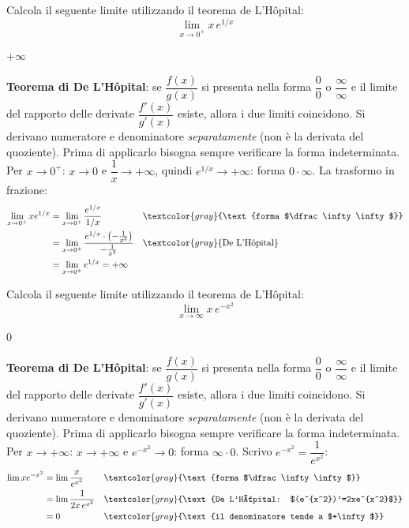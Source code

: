
\begin{question}[ID=1.7, subtitle={De L'Hôpital: $\lim_{x\to0^+} xe^{1/x}$}, tags={de l'hospital, limiti}, difficulty=media]
Calcola il seguente limite utilizzando il teorema de L'Hôpital:
\[
\lim_{x \to 0^+}  x\, e^{1/x}
\]
\begin{solution}
$+\infty$
\end{solution}
\begin{explanation}
\textbf{Teorema di De L'Hôpital}: se $\dfrac{f(x)}{g(x)}$ si presenta nella forma $\dfrac00$ o $\dfrac\infty\infty$ e il limite del rapporto delle derivate $\dfrac{f'(x)}{g'(x)}$ esiste, allora i due limiti coincidono. Si derivano numeratore e denominatore \emph{separatamente} (non è la derivata del quoziente). Prima di applicarlo bisogna sempre verificare la forma indeterminata.
Per $x\to0^+$: $x\to0$ e $\dfrac1x\to+\infty$, quindi $e^{1/x}\to+\infty$: forma $0\cdot\infty$. La trasformo in frazione:
\[\begin{aligned}
\lim_{x\to0^+}xe^{1/x} &= \lim_{x\to0^+}\dfrac{e^{1/x}}{1/x} && \textcolor{gray}{\text{forma $\dfrac\infty\infty$}}\\
&= \lim_{x\to0^+}\dfrac{e^{1/x}\cdot\left(-\frac1{x^2}\right)}{-\frac1{x^2}} && \textcolor{gray}{\text{De L'Hôpital}}\\
&= \lim_{x\to0^+}e^{1/x}=+\infty
\end{aligned}\]
\end{explanation}
\end{question}


\begin{question}[ID=1.8, subtitle={De L'Hôpital: $\lim_{x\to+\infty} xe^{-x^2}$}, tags={de l'hospital, limiti}, difficulty=facile]
Calcola il seguente limite utilizzando il teorema de L'Hôpital:
\[
\lim_{x \to \infty}  x\, e^{-x^2}
\]
\begin{solution}
$0$
\end{solution}
\begin{explanation}
\textbf{Teorema di De L'Hôpital}: se $\dfrac{f(x)}{g(x)}$ si presenta nella forma $\dfrac00$ o $\dfrac\infty\infty$ e il limite del rapporto delle derivate $\dfrac{f'(x)}{g'(x)}$ esiste, allora i due limiti coincidono. Si derivano numeratore e denominatore \emph{separatamente} (non è la derivata del quoziente). Prima di applicarlo bisogna sempre verificare la forma indeterminata.
Per $x\to+\infty$: $x\to+\infty$ e $e^{-x^2}\to0$: forma $\infty\cdot0$. Scrivo $e^{-x^2}=\dfrac{1}{e^{x^2}}$:
\[\begin{aligned}
\lim xe^{-x^2} &= \lim\dfrac{x}{e^{x^2}} && \textcolor{gray}{\text{forma $\dfrac\infty\infty$}}\\
&= \lim\dfrac{1}{2x\,e^{x^2}} && \textcolor{gray}{\text{De L'Hôpital: $(e^{x^2})'=2xe^{x^2}$}}\\
&= 0 && \textcolor{gray}{\text{il denominatore tende a $+\infty$}}
\end{aligned}\]
\end{explanation}
\end{question}
